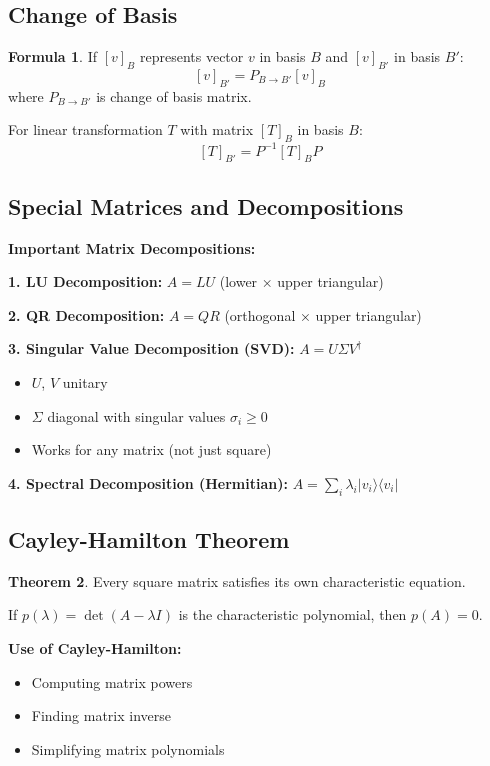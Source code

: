 \documentclass[12pt,a4paper]{article}
\theoremstyle{definition}
\newtheorem{theorem}{Theorem}[section]
\newtheorem{formula}[theorem]{Formula}
\begin{document}
\subsection{Change of Basis}

\begin{formula}
If $[v]_B$ represents vector $v$ in basis $B$ and $[v]_{B'}$ in basis $B'$:
\[
[v]_{B'} = P_{B \to B'}[v]_B
\]
where $P_{B \to B'}$ is change of basis matrix.

For linear transformation $T$ with matrix $[T]_B$ in basis $B$:
\[
[T]_{B'} = P^{-1}[T]_BP
\]
\end{formula}

\subsection{Special Matrices and Decompositions}

\begin{importantbox}
\textbf{Important Matrix Decompositions:}

\textbf{1. LU Decomposition:} $A = LU$ (lower × upper triangular)

\textbf{2. QR Decomposition:} $A = QR$ (orthogonal × upper triangular)

\textbf{3. Singular Value Decomposition (SVD):} $A = U\Sigma V^\dagger$
\begin{itemize}
    \item $U$, $V$ unitary
    \item $\Sigma$ diagonal with singular values $\sigma_i \geq 0$
    \item Works for any matrix (not just square)
\end{itemize}

\textbf{4. Spectral Decomposition (Hermitian):} $A = \sum_i \lambda_i|v_i\rangle\langle v_i|$
\end{importantbox}

\subsection{Cayley-Hamilton Theorem}

\begin{theorem}
Every square matrix satisfies its own characteristic equation.

If $p(\lambda) = \det(A - \lambda I)$ is the characteristic polynomial, then $p(A) = 0$.
\end{theorem}

\begin{tipbox}
\textbf{Use of Cayley-Hamilton:}
\begin{itemize}
    \item Computing matrix powers
    \item Finding matrix inverse
    \item Simplifying matrix polynomials
\end{itemize}
\end{tipbox}
\end{document}
